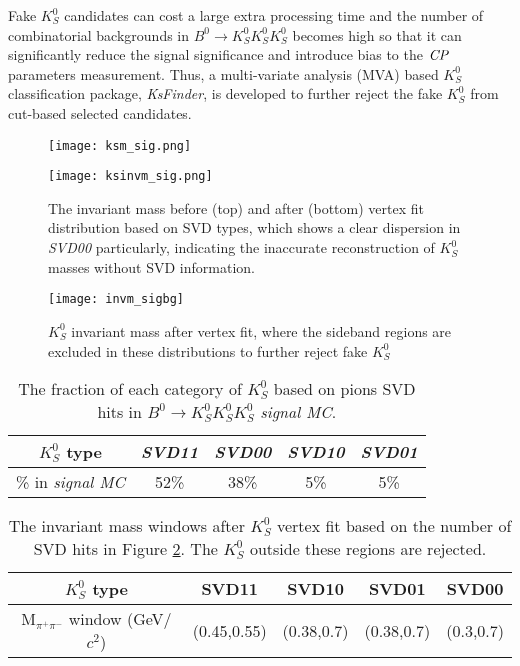 Fake $K_S^0$ candidates can cost a large extra processing time and the number of combinatorial backgrounds in $B^0 \to K_S^0  K_S^0  K_S^0$ becomes high so that it can significantly reduce the signal significance and introduce bias to the $\it{CP}$ parameters measurement. Thus, a multi-variate analysis (MVA) based $K_S^0$ classification package, \textit{KsFinder}, is developed to further reject the fake $K_S^0$ from cut-based selected candidates.


\begin{figure}[htpb]
	\begin{minipage}[b]{1\linewidth}
		\centering 
		\texttt{[image: ksm\_sig.png]}
	\end{minipage}
	\begin{minipage}[b]{1\linewidth}
		\centering 
		\texttt{[image: ksinvm\_sig.png]}
	\end{minipage}
	\caption{The invariant mass before (top) and after (bottom) vertex fit distribution based on SVD types, which shows a clear dispersion in \textit{SVD00} particularly, indicating the inaccurate reconstruction of $K_S^0$ masses without SVD information.}
	\label{fig:invm1}
\end{figure}

\begin{figure}[htpb]
	\centering
	\texttt{[image: invm\_sigbg]}
	\caption{$K_S^0$ invariant mass after vertex fit, where the sideband regions are excluded in these distributions to further reject fake $K_S^0$}
	\label{fig:invm}
\end{figure}

\begin{table}[H]
	\centering
	\begin{tabular}{|c|c|c|c|c|}
		\hline
		$K_S^0$ type & \textit{SVD11} & \textit{SVD00} & \textit{SVD10} & \textit{SVD01}\\
		\hline
		\% in \textit{signal MC} & 52\% & 38\% & 5\% & 5\%\\
		\hline
	\end{tabular}
	\caption{The fraction of each category of $K_S^0$ based on pions SVD hits in $B^0 \to K_S^0  K_S^0  K_S^0$ \textit{signal MC}.}
	\label{tab:svdxx}
\end{table}

\begin{table}[h]
	\centering 
	\begin{tabular}{|c|c|c|c|c|} 
		\hline
		$K_S^0$ type & SVD11 & SVD10 & SVD01  & SVD00  \\
		\hline
		M$_{\pi^+\pi^-}$ window (GeV/$c^2$) & (0.45,0.55) & (0.38,0.7)  & (0.38,0.7)  & (0.3,0.7) \\
		\hline
	\end{tabular}
	\caption{The invariant mass windows after $K_S^0$ vertex fit based on the number of SVD hits in Figure \ref{fig:invm}. The $K_S^0$ outside these regions are rejected.}
	\label{tab:ks_invm}
\end{table}



